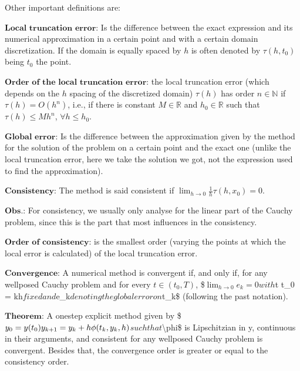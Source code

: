 \documentclass[letterpaper,10pt,english]{jupyterBook}
\begin{document}
\sphinxAtStartPar
Other important definitions are:

\sphinxAtStartPar
\(\textbf{Local truncation error:}\) Is the difference between the exact expression and its numerical approximation in a certain point and with a certain domain discretization. If the domain is equally spaced by \(h\) is often denoted by \(\tau(h,t_0)\) being \(t_0\) the point.

\sphinxAtStartPar
\(\textbf{Order of the local truncation error:}\) the local truncation error (which depends on the \(h\) spacing of the discretized domain) \(\tau(h)\) has order \(n \in \mathbb{N}\) if \(\tau(h) = O(h^n) \), i.e., if there is constant \(M \in \mathbb{R}\) and \(h_0 \in \mathbb{R}\) such that \(\tau(h) \leq M h^n\), \(\forall h \leq h_0\).

\sphinxAtStartPar
\(\textbf{Global error:}\) Is the difference between the approximation given by the method for the solution of the problem on a certain point and the exact one (unlike the local truncation error, here we take the solution we got, not the expression used to find the approximation).

\sphinxAtStartPar
\(\textbf{Consistency:}\) The method is said consistent if \(\lim _{h \to 0} \frac{1}{h}\tau(h,x_0) = 0\).

\sphinxAtStartPar
\(\textbf{Obs.:}\) For consistency, we usually only analyse for the linear part of the Cauchy problem, since this is the part that most influences in the consistency.

\sphinxAtStartPar
\(\textbf{Order of consistency:}\) is the smallest order (varying the points at which the local error is calculated) of the local truncation error.

\sphinxAtStartPar
\(\textbf{Convergence:}\) A numerical method is convergent if, and only if, for any well\sphinxhyphen{}posed Cauchy problem and for every \(t \in (t_0, T)\),
\$\(\lim_{h \to 0} e_k = 0\)\(
with \)t \sphinxhyphen{} t\_0 = kh\( fixed and \)e\_k\( denoting the global error on \)t\_k\$ (following the past notation).

\sphinxAtStartPar
\(\textbf{Theorem:}\) A one\sphinxhyphen{}step explicit method given by
\$\(
y_0 = y(t_0) \\
y_{k+1} = y_{k} + h \phi (t_{k},y_{k},h)
\)\(
such that \)\textbackslash{}phi\$ is Lipschitzian in y, continuous in their arguments, and consistent for any well\sphinxhyphen{}posed Cauchy problem is convergent. Besides that, the convergence order is greater or equal to the consistency order.
\end{document}

